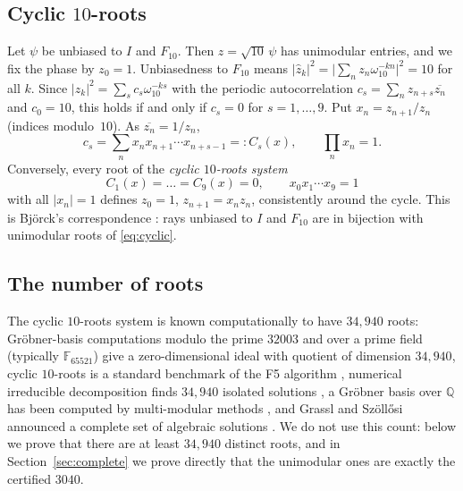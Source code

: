 \documentclass[11pt]{article}
\theoremstyle{definition}
\theoremstyle{remark}
\newcommand{\Q}{\mathbb{Q}}
\newcommand{\F}{\mathbb{F}}
\begin{document}
\subsection{\texorpdfstring{Cyclic $10$-roots}{Cyclic 10-roots}}
Let $\psi$ be unbiased to $I$ and $F_{10}$. Then $z=\sqrt{10}\,\psi$ has unimodular entries, and we fix the phase by
$z_0=1$. Unbiasedness to $F_{10}$ means $|\hat z_k|^2=\bigl|\sum_n z_n\omega_{10}^{-kn}\bigr|^2=10$ for all $k$.
Since $|\hat z_k|^2=\sum_s c_s\omega_{10}^{-ks}$ with the periodic autocorrelation $c_s=\sum_n z_{n+s}\overline{z_n}$
and $c_0=10$, this holds if and only if $c_s=0$ for $s=1,\dots,9$. Put $x_n=z_{n+1}/z_n$ (indices modulo~$10$). As
$\overline{z_n}=1/z_n$,
\[
c_s=\sum_{n}x_nx_{n+1}\cdots x_{n+s-1}=:C_s(x),\qquad \prod_n x_n=1 .
\]
Conversely, every root of the \emph{cyclic $10$-roots system}
\begin{equation}\label{eq:cyclic}
C_1(x)=\dots=C_9(x)=0,\qquad x_0x_1\cdots x_9=1
\end{equation}
with all $|x_n|=1$ defines $z_0=1$, $z_{n+1}=x_nz_n$, consistently around the cycle. This is Bj\"orck's
correspondence \cite{Bjorck1990}: rays unbiased to $I$ and $F_{10}$ are in bijection with unimodular roots of
\eqref{eq:cyclic}.

\subsection{The number of roots}\label{sec:count}
The cyclic $10$-roots system is known computationally to have $34{,}940$ roots: Gröbner-basis computations modulo the
prime $32003$ \cite{SteelMagma} and over a prime field (typically $\F_{65521}$) \cite{FaugereSvartz2013} give a zero-dimensional ideal with quotient of
dimension $34{,}940$, cyclic $10$-roots is a standard benchmark of the F5 algorithm \cite{Faugere2002}, numerical
irreducible decomposition finds $34{,}940$ isolated solutions \cite{SVW2001}, a Gröbner basis over $\Q$ has been
computed by multi-modular methods \cite{Parisse2019}, and Grassl and Sz\"oll\H{o}si announced a complete set of
algebraic solutions \cite{GrasslSzollosi2022}. We do not use this count: below we prove that there are at least
$34{,}940$ distinct roots, and in Section~\ref{sec:complete} we prove directly that the unimodular ones are exactly the
certified $3040$.
\end{document}

